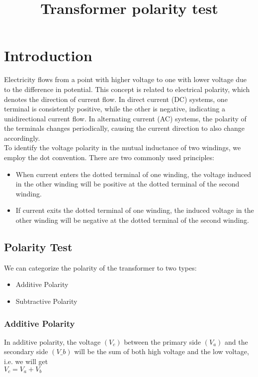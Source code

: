 \documentclass[12pt]{article}
\title{Transformer polarity test}
\author{}
\date{}
\begin{document}

\pagebreak

\tableofcontents

\maketitle
\section{Introduction}

Electricity flows from a point with higher voltage to one with lower voltage due to the difference in potential. This concept is related to electrical polarity, which denotes the direction of current flow. In direct current (DC) systems, one terminal is consistently positive, while the other is negative, indicating a unidirectional current flow. In alternating current (AC) systems, the polarity of the terminals changes periodically, causing the current direction to also change accordingly.\cite{polarity}\\

To identify the voltage polarity in the mutual inductance of two windings, we employ the dot convention. There are two commonly used principles:
\begin{itemize}
    \item When current enters the dotted terminal of one winding, the voltage induced in the other winding will be positive at the dotted terminal of the second winding.
    \item If current exits the dotted terminal of one winding, the induced voltage in the other winding will be negative at the dotted terminal of the second winding.
\end{itemize}

\subsection{Polarity Test}
We can categorize the polarity of the transformer to two types:
\begin{itemize}
    \item Additive Polarity
    \item Subtractive Polarity
\end{itemize}

\subsubsection*{Additive Polarity}
In additive polarity, the voltage $(V_c)$ between the primary side $(V_a)$ and the secondary side $(V\_b)$ will be the sum of both high voltage and the low voltage, i.e. we will get\\ \indent $V_c = V_a + V_b$
\end{document}
